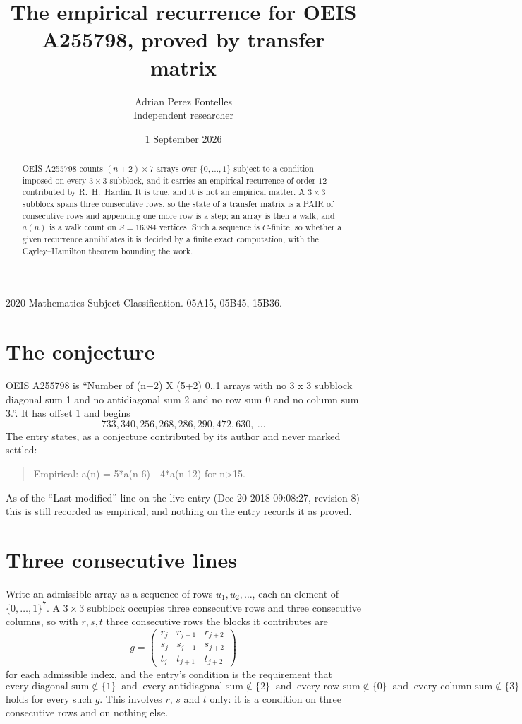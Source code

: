 \documentclass[11pt,a4paper]{article}
\title{The empirical recurrence for OEIS A255798, proved by transfer matrix}
\author{Adrian Perez Fontelles\\ \small Independent researcher}
\date{1 September 2026}
\theoremstyle{plain}
\theoremstyle{definition}
\begin{document}
\maketitle

\begin{abstract}
OEIS A255798 counts $(n+2)\times7$ arrays over $\{0,\dots,1\}$ subject to a condition imposed on
every $3\times3$ subblock, and it carries an empirical recurrence of order $12$
contributed by R.~H.~Hardin. It is true, and it is not an empirical matter. A $3\times3$
subblock spans three consecutive rows, so the state of a transfer matrix is a PAIR of
consecutive rows and appending one more row is a step; an array is then a walk, and
$a(n)$ is a walk count on $S=16384$ vertices. Such a sequence is $C$-finite, so whether a given
recurrence annihilates it is decided by a finite exact computation, with the Cayley--Hamilton
theorem bounding the work.
\end{abstract}

\noindent\small 2020 Mathematics Subject Classification. 05A15, 05B45, 15B36.\normalsize

\section{The conjecture}

OEIS A255798 is ``Number of (n+2) X (5+2) 0..1 arrays with no 3 x 3 subblock diagonal sum 1 and no antidiagonal sum 2 and no row sum 0 and no column sum 3.''. It has offset $1$ and begins
\[
733, 340, 256, 268, 286, 290, 472, 630,\ \dots
\]
The entry states, as a conjecture contributed by its author and never marked settled:
\begin{quote}
Empirical: a(n) = 5*a(n-6) - 4*a(n-12) for n>15.
\end{quote}
As of the ``Last modified'' line on the live entry (Dec 20 2018 09:08:27, revision 8) this is still
recorded as empirical, and nothing on the entry records it as proved.

\section{Three consecutive lines}

Write an admissible array as a sequence of rows $u_1,u_2,\dots$, each an element of
$\{0,\dots,1\}^{7}$. A $3\times3$ subblock occupies three consecutive rows and
three consecutive columns, so with $r,s,t$ three consecutive rows the blocks it
contributes are
\[
g=\begin{pmatrix}r_j&r_{j+1}&r_{j+2}\\ s_j&s_{j+1}&s_{j+2}\\ t_j&t_{j+1}&t_{j+2}\end{pmatrix}
\]
for each admissible index, and the entry's condition is the requirement that
\[
\text{every diagonal sum} \notin \{1\}\ \text{ and }\ \text{every antidiagonal sum} \notin \{2\}\ \text{ and }\ \text{every row sum} \notin \{0\}\ \text{ and }\ \text{every column sum} \notin \{3\}
\]
holds for every such $g$. This involves $r$, $s$ and $t$ only: it is a condition on
three consecutive rows and on nothing else.
\end{document}
